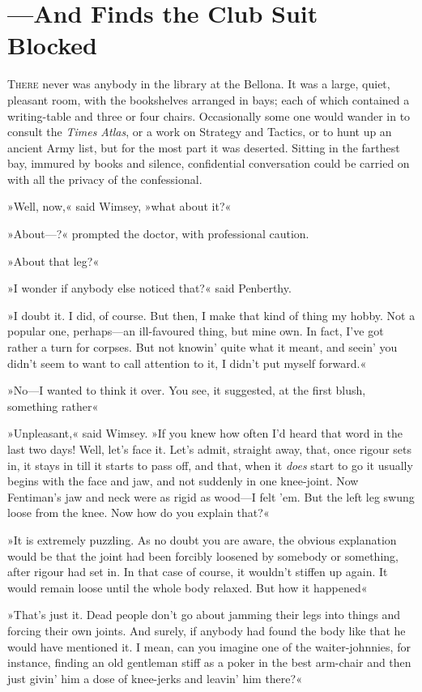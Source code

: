 \chapter{—And Finds the Club Suit Blocked}
\lettrine[lines=4]{T}{here} never was anybody in the library at the Bellona. It was a large, quiet, pleasant room, with the bookshelves arranged in bays; each of which contained a writing-table and three or four chairs. Occasionally some one would wander in to consult the \textit{Times Atlas}, or a work on Strategy and Tactics, or to hunt up an ancient Army list, but for the most part it was deserted. Sitting in the farthest bay, immured by books and silence, confidential conversation could be carried on with all the privacy of the confessional.

»Well, now,« said Wimsey, »what about it?«

»About—?« prompted the doctor, with professional caution.

»About that leg?«

»I wonder if anybody else noticed that?« said Penberthy.

»I doubt it. I did, of course. But then, I make that kind of thing my hobby. Not a popular one, perhaps—an ill-favoured thing, but mine own. In fact, I've got rather a turn for corpses. But not knowin' quite what it meant, and seein' you didn't seem to want to call attention to it, I didn't put myself forward.«

»No—I wanted to think it over. You see, it suggested, at the first blush, something rather\longdash«

»Unpleasant,« said Wimsey. »If you knew how often I'd heard that word in the last two days! Well, let's face it. Let's admit, straight away, that, once rigour sets in, it stays in till it starts to pass off, and that, when it \textit{does} start to go it usually begins with the face and jaw, and not suddenly in one knee-joint. Now Fentiman's jaw and neck were as rigid as wood—I felt 'em. But the left leg swung loose from the knee. Now how do you explain that?«

»It is extremely puzzling. As no doubt you are aware, the obvious explanation would be that the joint had been forcibly loosened by somebody or something, after rigour had set in. In that case of course, it wouldn't stiffen up again. It would remain loose until the whole body relaxed. But how it happened\longdash«

»That's just it. Dead people don't go about jamming their legs into things and forcing their own joints. And surely, if anybody had found the body like that he would have mentioned it. I mean, can you imagine one of the waiter-johnnies, for instance, finding an old gentleman stiff as a poker in the best arm-chair and then just givin' him a dose of knee-jerks and leavin' him there?«

